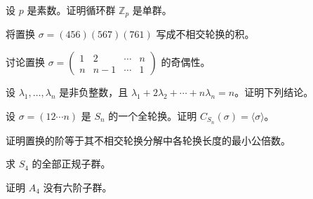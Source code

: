 \noindent\begin{minipage}{\textwidth}
设 $p$ 是素数。证明循环群 $\mathbb Z_p$ 是单群。
\end{minipage}\par\vfill
\noindent\begin{minipage}{\textwidth}
将置换 $\sigma=(456)(567)(761)$ 写成不相交轮换的积。
\end{minipage}\par\vfill
\newpage
\noindent\begin{minipage}{\textwidth}
讨论置换 $\sigma=\begin{pmatrix}1&2&\cdots&n\\ n&n-1&\cdots&1\end{pmatrix}$ 的奇偶性。
\end{minipage}\par\vfill
\noindent\begin{minipage}{\textwidth}
设 $\lambda_1,\ldots,\lambda_n$ 是非负整数，且 $\lambda_1+2\lambda_2+\cdots+n\lambda_n=n$。证明下列结论。
\end{minipage}\par\vfill
\noindent\begin{minipage}{\textwidth}
设 $\sigma=(12\cdots n)$ 是 $S_n$ 的一个全轮换。证明 $C_{S_n}(\sigma)=\langle\sigma\rangle$。
\end{minipage}\par\vfill
\newpage
\noindent\begin{minipage}{\textwidth}
证明置换的阶等于其不相交轮换分解中各轮换长度的最小公倍数。
\end{minipage}\par\vfill
\noindent\begin{minipage}{\textwidth}
求 $S_4$ 的全部正规子群。
\end{minipage}\par\vfill
\noindent\begin{minipage}{\textwidth}
证明 $A_4$ 没有六阶子群。
\end{minipage}\par\vfill
